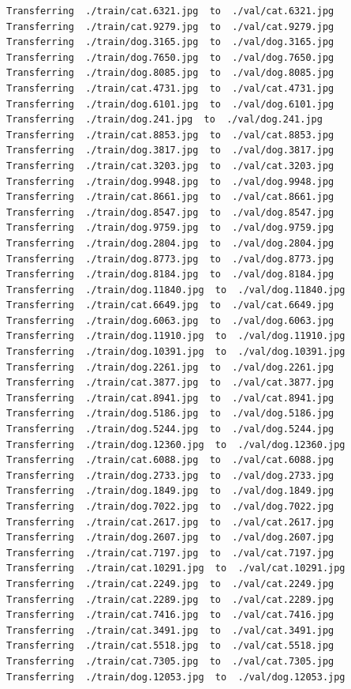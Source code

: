 \documentclass[]{book}
\theoremstyle{definition}
\theoremstyle{definition}
\theoremstyle{definition}
\theoremstyle{remark}
\begin{document}
\begin{verbatim}
Transferring  ./train/cat.6321.jpg  to  ./val/cat.6321.jpg
Transferring  ./train/cat.9279.jpg  to  ./val/cat.9279.jpg
Transferring  ./train/dog.3165.jpg  to  ./val/dog.3165.jpg
Transferring  ./train/dog.7650.jpg  to  ./val/dog.7650.jpg
Transferring  ./train/dog.8085.jpg  to  ./val/dog.8085.jpg
Transferring  ./train/cat.4731.jpg  to  ./val/cat.4731.jpg
Transferring  ./train/dog.6101.jpg  to  ./val/dog.6101.jpg
Transferring  ./train/dog.241.jpg  to  ./val/dog.241.jpg
Transferring  ./train/cat.8853.jpg  to  ./val/cat.8853.jpg
Transferring  ./train/dog.3817.jpg  to  ./val/dog.3817.jpg
Transferring  ./train/cat.3203.jpg  to  ./val/cat.3203.jpg
Transferring  ./train/dog.9948.jpg  to  ./val/dog.9948.jpg
Transferring  ./train/cat.8661.jpg  to  ./val/cat.8661.jpg
Transferring  ./train/dog.8547.jpg  to  ./val/dog.8547.jpg
Transferring  ./train/dog.9759.jpg  to  ./val/dog.9759.jpg
Transferring  ./train/dog.2804.jpg  to  ./val/dog.2804.jpg
Transferring  ./train/dog.8773.jpg  to  ./val/dog.8773.jpg
Transferring  ./train/dog.8184.jpg  to  ./val/dog.8184.jpg
Transferring  ./train/dog.11840.jpg  to  ./val/dog.11840.jpg
Transferring  ./train/cat.6649.jpg  to  ./val/cat.6649.jpg
Transferring  ./train/dog.6063.jpg  to  ./val/dog.6063.jpg
Transferring  ./train/dog.11910.jpg  to  ./val/dog.11910.jpg
Transferring  ./train/dog.10391.jpg  to  ./val/dog.10391.jpg
Transferring  ./train/dog.2261.jpg  to  ./val/dog.2261.jpg
Transferring  ./train/cat.3877.jpg  to  ./val/cat.3877.jpg
Transferring  ./train/cat.8941.jpg  to  ./val/cat.8941.jpg
Transferring  ./train/dog.5186.jpg  to  ./val/dog.5186.jpg
Transferring  ./train/dog.5244.jpg  to  ./val/dog.5244.jpg
Transferring  ./train/dog.12360.jpg  to  ./val/dog.12360.jpg
Transferring  ./train/cat.6088.jpg  to  ./val/cat.6088.jpg
Transferring  ./train/dog.2733.jpg  to  ./val/dog.2733.jpg
Transferring  ./train/dog.1849.jpg  to  ./val/dog.1849.jpg
Transferring  ./train/dog.7022.jpg  to  ./val/dog.7022.jpg
Transferring  ./train/cat.2617.jpg  to  ./val/cat.2617.jpg
Transferring  ./train/dog.2607.jpg  to  ./val/dog.2607.jpg
Transferring  ./train/cat.7197.jpg  to  ./val/cat.7197.jpg
Transferring  ./train/cat.10291.jpg  to  ./val/cat.10291.jpg
Transferring  ./train/cat.2249.jpg  to  ./val/cat.2249.jpg
Transferring  ./train/cat.2289.jpg  to  ./val/cat.2289.jpg
Transferring  ./train/cat.7416.jpg  to  ./val/cat.7416.jpg
Transferring  ./train/cat.3491.jpg  to  ./val/cat.3491.jpg
Transferring  ./train/cat.5518.jpg  to  ./val/cat.5518.jpg
Transferring  ./train/cat.7305.jpg  to  ./val/cat.7305.jpg
Transferring  ./train/dog.12053.jpg  to  ./val/dog.12053.jpg

\end{verbatim}
\end{document}

